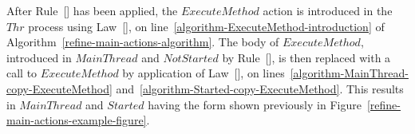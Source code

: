 After Rule~[] has been applied, the
$ExecuteMethod$ action is introduced in the $Thr$ process using
Law~[], on
line~\ref{algorithm-ExecuteMethod-introduction} of
Algorithm~\ref{refine-main-actions-algorithm}.
The body of $ExecuteMethod$, introduced in $MainThread$ and
$NotStarted$ by Rule~[], is then
replaced with a call to $ExecuteMethod$ by application of
Law~[], on
lines~\ref{algorithm-MainThread-copy-ExecuteMethod}
and~\ref{algorithm-Started-copy-ExecuteMethod}.
This results in $MainThread$ and $Started$ having the form shown
previously in Figure~\ref{refine-main-actions-example-figure}.
